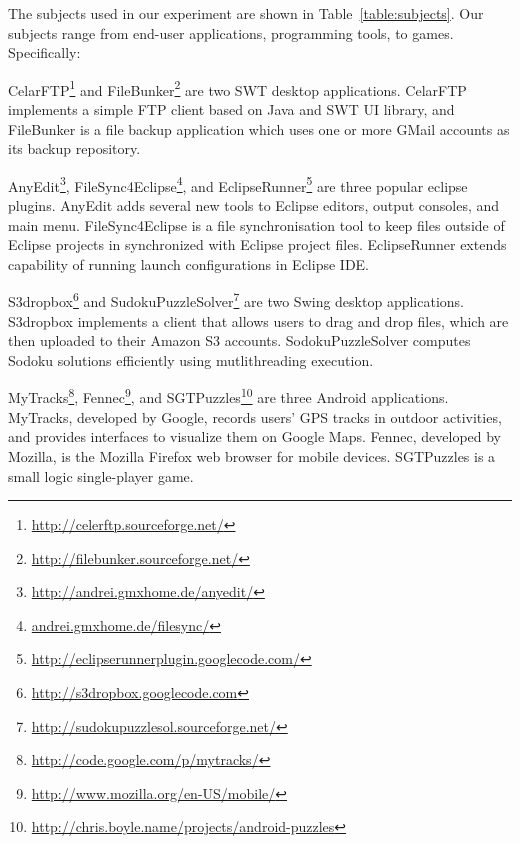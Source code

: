 The subjects used in our experiment are shown in Table~\ref{table:subjects}. Our
subjects range from end-user applications, programming tools, to games. Specifically:

\begin{itemize}
\Item CelarFTP\footnote{\url{http://celerftp.sourceforge.net/}}
and FileBunker\footnote{\url{http://filebunker.sourceforge.net/}} are two SWT desktop applications.
CelarFTP implements a simple FTP client based on Java and SWT UI library, and
FileBunker is a file backup application which uses one or more GMail accounts as its backup repository.

\Item  AnyEdit\footnote{\url{http://andrei.gmxhome.de/anyedit/}}, FileSync4Eclipse\footnote{\url{andrei.gmxhome.de/filesync/}}, and
EclipseRunner\footnote{\url{http://eclipserunnerplugin.googlecode.com/}} are three popular eclipse plugins.
AnyEdit adds several new tools to  Eclipse editors, output consoles, and main menu. 
FileSync4Eclipse is a file synchronisation tool to keep files outside of Eclipse projects in synchronized
with Eclipse project files. EclipseRunner extends capability of running launch configurations in Eclipse IDE.

\Item  S3dropbox\footnote{\url{http://s3dropbox.googlecode.com}} and SudokuPuzzleSolver\footnote{\url{http://sudokupuzzlesol.sourceforge.net/}}
are two Swing desktop applications. S3dropbox implements a client that allows users
to drag and drop files, which are then uploaded to their Amazon S3 accounts. SodokuPuzzleSolver
computes Sodoku solutions efficiently using mutlithreading execution. 

\Item  MyTracks\footnote{\url{http://code.google.com/p/mytracks/}}, Fennec\footnote{\url{http://www.mozilla.org/en-US/mobile/}},
and SGTPuzzles\footnote{\url{http://chris.boyle.name/projects/android-puzzles}} are three Android applications.
MyTracks, developed by Google, records users' GPS tracks in outdoor activities, and provides
interfaces to visualize them on Google Maps. Fennec, developed by Mozilla, is the Mozilla
Firefox web browser for mobile devices. SGTPuzzles is a small logic single-player game.

\end{itemize}



